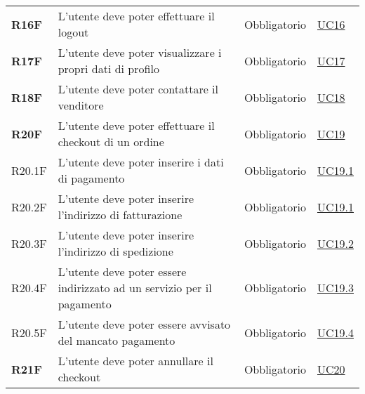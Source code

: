 \begin{center}
\begin{longtable}[!h]{p{50px} p{245px} p{75px} p{50px}}
        \textbf{R16F}                         & L'utente deve poter effettuare il logout                                                                   & Obbligatorio             & \hyperref[sec:UC16]{UC16}                    \\
        \textbf{R17F}                         & L'utente deve poter visualizzare i propri dati di profilo                                                  & Obbligatorio             & \hyperref[sec:UC17]{UC17}                    \\
        \textbf{R18F}                         & L'utente deve poter contattare il venditore                                                                & Obbligatorio             & \hyperref[sec:UC18]{UC18}                    \\
        \textbf{R20F}                         & L'utente deve poter effettuare il checkout di un ordine                                                    & Obbligatorio             & \hyperref[sec:UC19]{UC19}                    \\
        R20.1F                                & L'utente deve poter inserire i dati di pagamento                                                           & Obbligatorio             & \hyperref[sec:UC19.1]{UC19.1}                \\
        R20.2F                                & L'utente deve poter inserire l'indirizzo di fatturazione                                                   & Obbligatorio             & \hyperref[sec:UC19.1]{UC19.1}                \\
        R20.3F                                & L'utente deve poter inserire l'indirizzo di spedizione                                                     & Obbligatorio             & \hyperref[sec:UC19.2]{UC19.2}                \\
        R20.4F                                & L'utente deve poter essere indirizzato ad un servizio per il pagamento                                     & Obbligatorio             & \hyperref[sec:UC19.3]{UC19.3}                \\
        R20.5F                                & L'utente deve poter essere avvisato del mancato pagamento                                                  & Obbligatorio             & \hyperref[sec:UC19.4]{UC19.4}                \\
        \textbf{R21F}                         & L'utente deve poter annullare il checkout                                                                  & Obbligatorio             & \hyperref[sec:UC20]{UC20}                    \\

\end{longtable}
\end{center}
